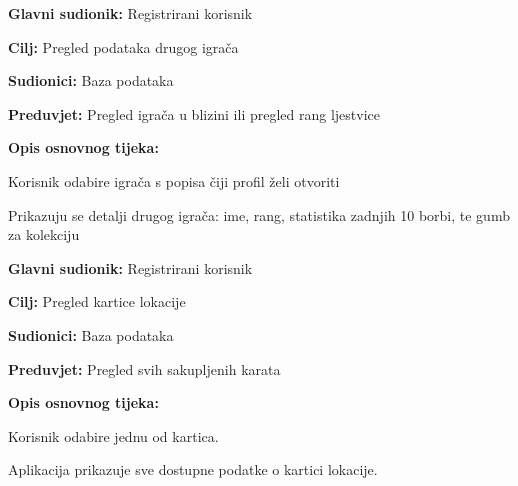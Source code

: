 \noindent {}
\begin{packed_item}
	
	\item \textbf{Glavni sudionik: }Registrirani korisnik
	\item  \textbf{Cilj:} Pregled podataka drugog igrača
	\item  \textbf{Sudionici:} Baza podataka
	\item  \textbf{Preduvjet:} Pregled igrača u blizini ili pregled rang ljestvice
	\item  \textbf{Opis osnovnog tijeka:}
	
	\item[] \begin{packed_enum}
		
		\item Korisnik odabire igrača s popisa čiji profil želi otvoriti
		\item Prikazuju se detalji drugog igrača: ime, rang, statistika zadnjih 10 borbi, te gumb za kolekciju
	\end{packed_enum}
\end{packed_item}

\noindent {}
\begin{packed_item}
	
	\item \textbf{Glavni sudionik: }Registrirani korisnik
	\item  \textbf{Cilj:} Pregled kartice lokacije
	\item  \textbf{Sudionici:} Baza podataka
	\item  \textbf{Preduvjet:} Pregled svih sakupljenih karata
	\item  \textbf{Opis osnovnog tijeka:}
	
	\item[] \begin{packed_enum}
		
		\item Korisnik odabire jednu od kartica.
		\item Aplikacija prikazuje sve dostupne podatke o kartici lokacije.
	\end{packed_enum}
\end{packed_item}

